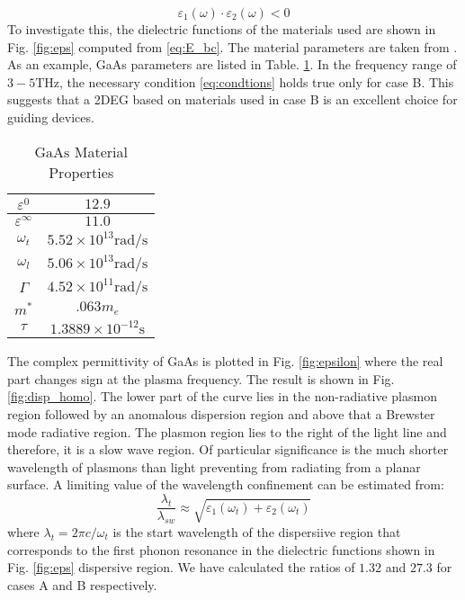 \documentclass[conference, 10pt]{IEEEtran}
\renewcommand{\O}{\omega}  %
\newcommand{\E}{\varepsilon}  %
\renewcommand{\inf}{\infty}  %
\renewcommand{\^}{\hat}  %
\begin{document}
%
\begin{equation}
  \E_1(\O) \cdot \E_2(\O) < 0
  \label{eq:condtions}
\end{equation}
%
%
To investigate this, the dielectric functions of the materials used are shown in Fig. \ref{fig:eps} computed from \eqref{eq:E_bc}. The material parameters are taken from \cite{Palik1997429, zhang1994infrared}. As an example, GaAs parameters are listed in Table. \ref{tab:data}. In the frequency range of $3-5 \mathrm{THz}$, the necessary condition \eqref{eq:condtions} holds true only for case B. This suggests that a 2DEG based on materials used in case B is an excellent choice for guiding devices.
%
\begin{table}[h]
\renewcommand{\arraystretch}{1.3}
\caption{$\mathrm{GaAs}$ Material Properties}
\label{table_example}
\centering
\begin{tabular}{c||c}
\hline
$\E^{0}$ & $12.9$\\ \hline
$\E^{\inf}$ & $11.0$ \\  \hline
$\O_t$ & $5.52 \times 10^{13} \mathrm{rad/s}$ \\  \hline
$\O_l$ & $5.06 \times 10^{13} \mathrm{rad/s}$ \\  \hline
$\Gamma$ &  $4.52 \times 10^{11} \mathrm{rad/s}$ \\  \hline
$m^{\ast}$ & $.063 m_e$ \\  \hline
$\tau$ & $1.3889 \times 10^{-12} \mathrm{s} $ \\  \hline
\end{tabular}
\label{tab:data}
\end{table}
%
The complex permittivity of GaAs is plotted in Fig. \ref{fig:epsilon} where the real part changes sign at the plasma frequency. The result is shown in Fig. \ref{fig:disp_homo}. The lower part of the curve lies in the non-radiative plasmon region followed by an anomalous dispersion region and above that a Brewster mode radiative region. The plasmon region lies to the right of the light line and therefore, it is a slow wave region. Of particular significance is the much shorter wavelength of plasmons than light preventing from radiating from a planar surface. A limiting value of the wavelength confinement can be estimated from:
%
\begin{equation}
  \frac{\lambda_{t}}{\lambda_{sw}} \approx {\sqrt{\E_1(\O_t) + \E_2(\O_t)}}
  \label{eq:wave_refine}
\end{equation}
%
where $\lambda_t = 2\pi c/{\O_t}$ is the start wavelength of the dispersiive region that corresponds to the first phonon resonance in the dielectric functions shown in Fig. \ref{fig:eps} dispersive region. We have calculated the ratios of $1.32$ and $27.3$ for cases A and B respectively.
\end{document}
